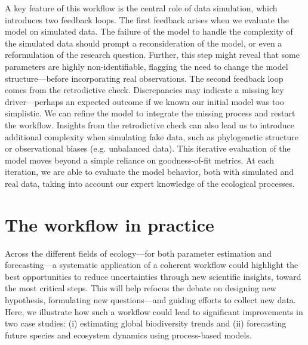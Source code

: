 \documentclass[11pt]{article}
\begin{document}
A key feature of this workflow is the central role of data simulation, which introduces two feedback loops. The first feedback arises when we evaluate the model on simulated data.
The failure of the model to handle the complexity of the simulated data should prompt a reconsideration of the model, or even a reformulation of the research question.
Further, %
this step might reveal that some parameters are highly non-identifiable, %
flagging the need to change the model structure---before incorporating real observations. 
The second feedback loop comes from the retrodictive check. 
Discrepancies may indicate a missing key driver---perhaps an expected outcome if we known our initial model was too simplistic. We can refine the model to integrate the missing process and restart the workflow. Insights from the retrodictive check can also lead us to introduce additional complexity when simulating fake data, such as phylogenetic structure or observational biases (e.g. unbalanced data). This iterative evaluation of the model moves beyond a simple reliance on goodness-of-fit metrics. At each iteration, we are able to evaluate the model behavior, both with simulated and real data, taking into account our expert knowledge of the ecological processes. 

\section{The workflow in practice}

Across the different fields of ecology---for both parameter estimation and forecasting---a systematic application of a coherent workflow could highlight the best opportunities to reduce uncertainties through new scientific insights, toward the most critical steps. This will help refocus the debate on designing new hypothesis, formulating new questions---and guiding efforts to collect new data. Here, we illustrate how such a workflow could lead to significant improvements in two case studies: (i) estimating global biodiversity trends and (ii) forecasting future species and ecosystem dynamics using process-based models.
\end{document}
